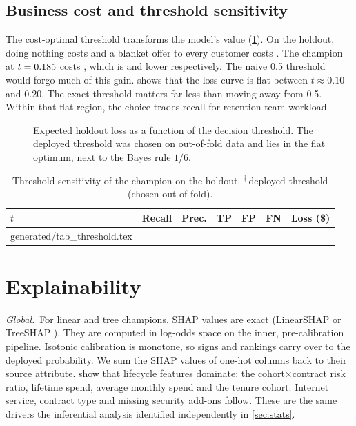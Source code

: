 \documentclass[conference]{IEEEtran}
\makeatletter
\newcommand{\genrows}[1]{\@@input generated/#1.tex }
\newcommand{\para}[1]{\par\textit{#1.}\ }%
\makeatother
\begin{document}
\subsection{Business cost and threshold sensitivity}
The cost-optimal threshold transforms the model's value (\cref{fig:cost}). On the holdout,
doing nothing costs \LossNone{} and a blanket offer to every customer costs \LossAll{}. The
champion at $t=0.185$ costs \LossChampion{}, which is \LossSavingNone{} and
\LossSavingAll{} lower respectively. The naive 0.5 threshold would forgo much of this gain.
 shows that the loss curve is flat between $t\approx0.10$ and $0.20$. The
exact threshold matters far less than moving away from 0.5. Within that flat region, the choice
trades recall for retention-team workload.

\begin{figure}[t]
\centering

\caption{Expected holdout loss as a function of the decision threshold. The deployed threshold
was chosen on out-of-fold data and lies in the flat optimum, next to the Bayes rule $1/6$.}
\label{fig:cost}
\end{figure}

\begin{table}[t]
\centering
\caption{Threshold sensitivity of the champion on the holdout. $^\dagger$\,deployed threshold
(chosen out-of-fold).}
\label{tab:threshold}
\footnotesize
\setlength{\tabcolsep}{4.5pt}
\begin{tabular}{@{}l c c r r r r@{}}
\toprule
$t$ & \textbf{Recall} & \textbf{Prec.} & TP & FP & FN & \textbf{Loss (\$)}\\
\midrule
\genrows{tab_threshold}
\bottomrule
\end{tabular}
\end{table}

\section{Explainability}
\label{sec:xai}

\para{Global}For linear and tree champions, SHAP values are exact (LinearSHAP or
TreeSHAP \cite{lundberg2017unified,lundberg2020local}). They are computed in log-odds space on the
inner, pre-calibration pipeline. Isotonic calibration is monotone, so signs and rankings carry
over to the deployed probability. We sum the SHAP values of one-hot columns back to their source
attribute.  show that lifecycle features dominate: the
cohort$\times$contract risk ratio, lifetime spend, average monthly spend and the tenure cohort.
Internet service, contract type and missing security add-ons follow. These are the same drivers the
inferential analysis identified independently in \cref{sec:stats}.
\end{document}
